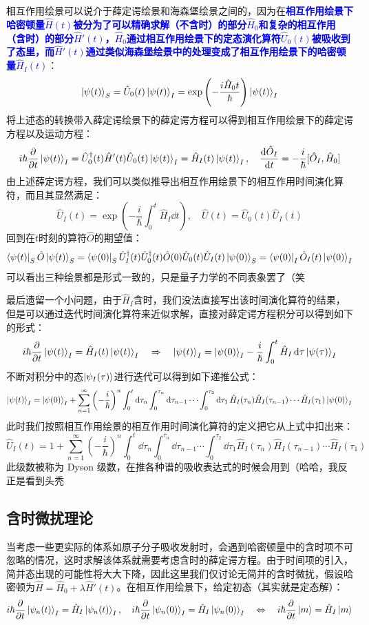 相互作用绘景可以说介于薛定谔绘景和海森堡绘景之间的，因为在\textcolor{blue}{\textbf{相互作用绘景下哈密顿量$\hat{H}(t)$被分为了可以精确求解（不含时）的部分$\hat{H}_0$和复杂的相互作用（含时）的部分$\hat{H}'(t)$，$\hat{H}_0$通过相互作用绘景下的定态演化算符$\hat{U}_0(t)$被吸收到了态里，而$\hat{H}'(t)$通过类似海森堡绘景中的处理变成了相互作用绘景下的哈密顿量$\hat{H}_I(t)$}}：
\[\ket{\psi(t)}_S=\hat{U}_0(t)\ket{\psi(t)}_I=\exp\left(-\frac{i\hat{H}_0t}{\hbar}\right)\ket{\psi(t)}_I\]
将上述态的转换带入薛定谔绘景下的薛定谔方程可以得到相互作用绘景下的薛定谔方程以及运动方程：
\[i\hbar\pdv{t}\ket{\psi(t)}_I=\hat{U}^{\dagger}_0(t)\hat{H}'(t)\hat{U}_0(t)\ket{\psi(t)}_I=\hat{H}_I(t)\ket{\psi(t)}_I, \quad \dv{\hat{O}_I}{t}=-\frac{i}{\hbar}[\hat{O}_I,\hat{H}_0]\]
由上述薛定谔方程，我们可以类似推导出相互作用绘景下的相互作用时间演化算符，而且其显然满足：
\[\hat{U}_I(t)=\exp\left(-\frac{i}{\hbar}\int_{0}^{t}\hat{H}_I\dd{t}\right), \quad \hat{U}(t)=\hat{U}_0(t)\hat{U}_I(t)\]
回到在$t$时刻的算符$\hat{O}$的期望值：
\[\bra{\psi(t)}_S\hat{O}\ket{\psi(t)}_S=\bra{\psi(0)}_S\hat{U}_I^{\dagger}(t)\hat{U}_0^{\dagger}(t)\hat{O}(0)\hat{U}_0(t)\hat{U}_I(t)\ket{\psi(0)}_S=\bra{\psi(0)}_I\hat{O}_I(t)\ket{\psi(0)}_I\]
可以看出三种绘景都是形式一致的，只是量子力学的不同表象罢了（笑

最后遗留一个小问题，由于$\hat{H}_I$含时，我们没法直接写出该时间演化算符的结果，但是可以通过迭代时间演化算符来近似求解，直接对薛定谔方程积分可以得到如下的形式：
\[i\hbar\pdv{t}\ket{\psi(t)}_I=\hat{H}_I(t)\ket{\psi(t)}_I \quad \Rightarrow \quad \ket{\psi(t)}_I=\ket{\psi(0)}_I-\frac{i}{\hbar}\int_{0}^{t}\hat{H}_I\dd{\tau}\ket{\psi(\tau)}_I\]
不断对积分中的态$\ket{\psi_I(\tau)}$进行迭代可以得到如下递推公式：
\[\ket{\psi(t)}_I=\ket{\psi(0)}_I+\sum_{n=1}^{\infty}\left(-\frac{i}{\hbar}\right)^n\int_{0}^t\dd{\tau_n}\int_{0}^{\tau_n}\dd{\tau_{n-1}}\cdots\int_{0}^{\tau_2}\dd{\tau_1}\hat{H}_I(\tau_n)\hat{H}_I(\tau_{n-1})\cdots\hat{H}_I(\tau_1)\ket{\psi(0)}_I\]
此时我们按照相互作用绘景的相互作用时间演化算符的定义把它从上式中扣出来：
\[\hat{U}_I(t)=1+\sum_{n=1}^{\infty}\left(-\frac{i}{\hbar}\right)^n\int_{0}^t\dd{\tau_n}\int_{0}^{\tau_n}\dd{\tau_{n-1}}\cdots\int_{0}^{\tau_2}\dd{\tau_1}\hat{H}_I(\tau_n)\hat{H}_I(\tau_{n-1})\cdots\hat{H}_I(\tau_1)\]
此级数被称为 Dyson 级数，在推各种谱的吸收表达式的时候会用到（哈哈，我反正是看到头秃

\subsection{含时微扰理论}
当考虑一些更实际的体系如原子分子吸收发射时，会遇到哈密顿量中的含时项不可忽略的情况，这时求解该体系就需要考虑含时的薛定谔方程。由于时间项的引入，简并态出现的可能性将大大下降，因此这里我们仅讨论无简并的含时微扰，假设哈密顿为$\hat{H}=\hat{H}_0+\lambda\hat{H}'(t)$。在相互作用绘景下，给定初态（其实就是定态解）：
\[i\hbar\pdv{t}\ket{\psi_n(t)}_I=\hat{H}_I\ket{\psi_n(t)}_I, \quad i\hbar\pdv{t}\ket{\psi_n(0)}_I=\hat{H}_I\ket{\psi_n(0)}_I \quad \Leftrightarrow \quad i\hbar\pdv{t}\ket{m}=\hat{H}_I\ket{m}\]

